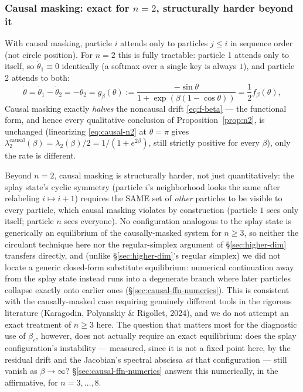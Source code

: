 \documentclass[11pt]{article}
\begin{document}
\subsubsection{Causal masking: exact for $n=2$, structurally harder beyond it}
\label{sec:causal}

With causal masking, particle $i$ attends only to particles $j\le i$ in sequence order (not circle position). For $n=2$ this is fully tractable: particle 1 attends only to itself, so $\dot\theta_1\equiv0$ identically (a softmax over a single key is always $1$), and particle 2 attends to both:
\begin{equation}
    \dot\theta = \dot\theta_1 - \dot\theta_2 = -\dot\theta_2 = g_\beta(\theta) := \frac{-\sin\theta}{1+\exp(\beta(1-\cos\theta))} = \frac{1}{2}f_\beta(\theta),
    \label{eq:causal-n2}
\end{equation}
Causal masking exactly \emph{halves} the noncausal drift \eqref{eq:f-beta} --- the functional form, and hence every qualitative conclusion of Proposition~\ref{prop:n2}, is unchanged (linearizing \eqref{eq:causal-n2} at $\theta=\pi$ gives $\lambda_2^{\mathrm{causal}}(\beta)=\lambda_2(\beta)/2=1/(1+e^{2\beta})$, still strictly positive for every $\beta$), only the rate is different.

Beyond $n=2$, causal masking is structurally harder, not just quantitatively: the splay state's cyclic symmetry (particle $i$'s neighborhood looks the same after relabeling $i\mapsto i+1$) requires the SAME set of \emph{other} particles to be visible to every particle, which causal masking violates by construction (particle $1$ sees only itself; particle $n$ sees everyone). No configuration analogous to the splay state is generically an equilibrium of the causally-masked system for $n\ge3$, so neither the circulant technique here nor the regular-simplex argument of \S\ref{sec:higher-dim} transfers directly, and (unlike \S\ref{sec:higher-dim}'s regular simplex) we did not locate a generic closed-form substitute equilibrium: numerical continuation away from the splay state instead runs into a degenerate branch where later particles collapse exactly onto earlier ones (\S\ref{sec:causal-ffn-numerics}). This is consistent with the causally-masked case requiring genuinely different tools in the rigorous literature (Karagodin, Polyanskiy \& Rigollet, 2024), and we do not attempt an exact treatment of $n\ge3$ here. The question that matters most for the diagnostic use of $\beta_c$, however, does not actually require an exact equilibrium: does the splay configuration's instability --- measured, since it is not a fixed point here, by the residual drift and the Jacobian's spectral abscissa \emph{at} that configuration --- still vanish as $\beta\to\infty$? \S\ref{sec:causal-ffn-numerics} answers this numerically, in the affirmative, for $n=3,\dots,8$.
\end{document}
